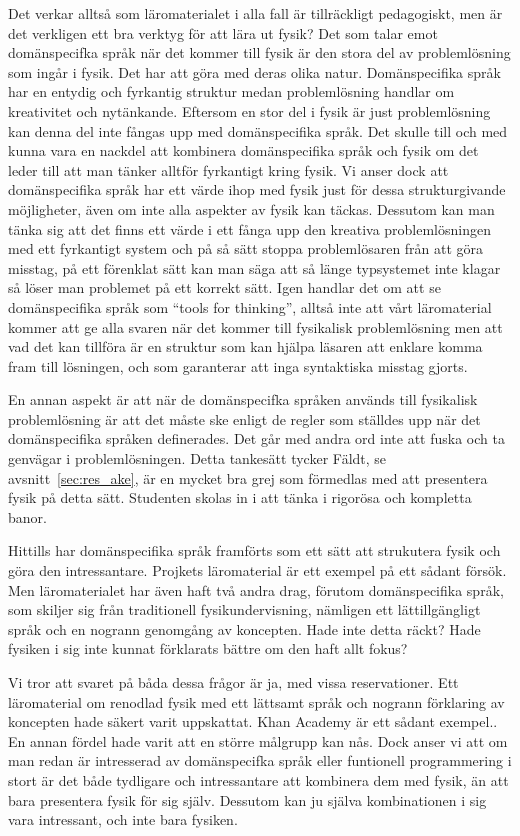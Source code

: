 \begin{draft}
Det verkar alltså som läromaterialet i alla fall är tillräckligt pedagogiskt,
men är det verkligen ett bra verktyg för att lära ut fysik? Det som talar emot
domänspecifka språk när det kommer till fysik är den stora del av problemlösning
som ingår i fysik. Det har att göra med deras olika natur. Domänspecifika språk
har en entydig och fyrkantig struktur medan problemlösning handlar om
kreativitet och nytänkande. Eftersom en stor del i fysik är just problemlösning
kan denna del inte fångas upp med domänspecifika språk. Det skulle till och med
kunna vara en nackdel att kombinera domänspecifika språk och fysik om det leder
till att man tänker alltför fyrkantigt kring fysik. Vi anser dock att
domänspecifika språk har ett värde ihop med fysik just för dessa strukturgivande
möjligheter, även om inte alla aspekter av fysik kan täckas.  Dessutom kan man
tänka sig att det finns ett värde i ett fånga upp den kreativa problemlösningen
med ett fyrkantigt system och på så sätt stoppa problemlösaren från att göra
misstag, på ett förenklat sätt kan man säga att så länge typsystemet inte klagar
så löser man problemet på ett korrekt sätt. Igen handlar det om att se
domänspecifika språk som ``tools for thinking'', alltså inte att vårt
läromaterial kommer att ge alla svaren när det kommer till fysikalisk
problemlösning men att vad det kan tillföra är en struktur som kan hjälpa
läsaren att enklare komma fram till lösningen, och som garanterar att inga
syntaktiska misstag gjorts.

En annan aspekt är att när de domänspecifka språken används till fysikalisk
problemlösning är att det måste ske enligt de regler som ställdes upp när det
domänspecifika språken definerades. Det går med andra ord inte att fuska och ta
genvägar i problemlösningen. Detta tankesätt tycker Fäldt, se
avsnitt~\ref{sec:res_ake}, är en mycket bra grej som förmedlas med att
presentera fysik på detta sätt. Studenten skolas in i att tänka i rigorösa och
kompletta banor.

Hittills har domänspecifika språk framförts som ett sätt att strukutera fysik
och göra den intressantare. Projkets läromaterial är ett exempel på ett sådant
försök. Men läromaterialet har även haft två andra drag, förutom domänspecifika
språk, som skiljer sig från traditionell fysikundervisning, nämligen ett
lättillgängligt språk och en nogrann genomgång av koncepten. Hade inte detta
räckt? Hade fysiken i sig inte kunnat förklarats bättre om den haft allt fokus?

Vi tror att svaret på båda dessa frågor är ja, med vissa reservationer. Ett
läromaterial om renodlad fysik med ett lättsamt språk och nogrann förklaring av
koncepten hade säkert varit uppskattat. Khan Academy är ett sådant
exempel.\cite{khan}. En annan fördel hade varit att en större målgrupp kan nås.
Dock anser vi att om man redan är intresserad av domänspecifka språk eller
funtionell programmering i stort är det både tydligare och intressantare att
kombinera dem med fysik, än att bara presentera fysik för sig själv. Dessutom
kan ju själva kombinationen i sig vara intressant, och inte bara fysiken.


\end{draft}
